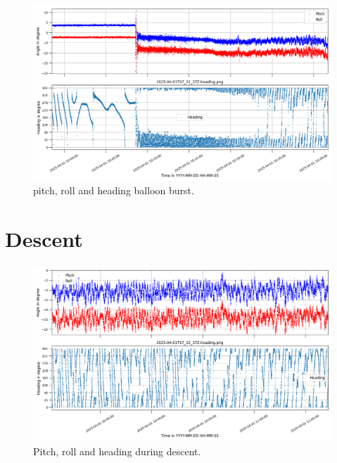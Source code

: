 \begin{figure}[H]
    \centering
    \includegraphics[width=\linewidth]{images/04_results/pop_heading.png}
    \caption[Heading at balloon burst.]{pitch, roll and heading balloon burst.}
    \label{fig:res:pop_angles}
\end{figure}


\section{Descent \label{sec:descent}}

\begin{figure}[H]
    \centering
    \includegraphics[width=\linewidth]{images/04_results/descend_heading.png}
    \caption[Heading during descent.]{Pitch, roll and heading during descent.}
    \label{fig:res:descent_angles}
\end{figure}